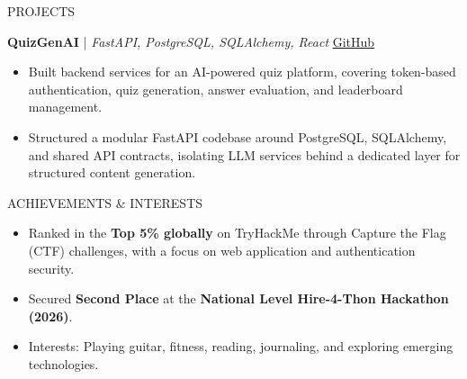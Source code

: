 \documentclass{resume} %
\begin{document}
\begin{rSection}{PROJECTS}
\vspace{-0.1em}


\textbf{QuizGenAI} | {\small\textit{FastAPI, PostgreSQL, SQLAlchemy, React}} \hfill
\href{https://github.com/jayadityadev/QuizGenAI}{GitHub} \\
\vspace{-1.5em}

\begin{itemize}
    \itemsep -3pt
    \item Built backend services for an AI-powered quiz platform, covering token-based authentication, quiz generation, answer evaluation, and leaderboard management.
    \item Structured a modular FastAPI codebase around PostgreSQL, SQLAlchemy, and shared API contracts, isolating LLM services behind a dedicated layer for structured content generation.
\end{itemize}
 

\end{rSection}

\vspace{-0.5em}
\begin{rSection}{ACHIEVEMENTS \& INTERESTS}
\begin{itemize}
    \itemsep -3pt
    \item Ranked in the \textbf{Top 5\% globally} on TryHackMe through Capture the Flag (CTF) challenges, with a focus on web application and authentication security.
    \item Secured \textbf{Second Place} at the \textbf{National Level Hire-4-Thon Hackathon (2026)}.
    \item Interests: Playing guitar, fitness, reading, journaling, and exploring emerging technologies.
\end{itemize}

\end{rSection}
\end{document}
